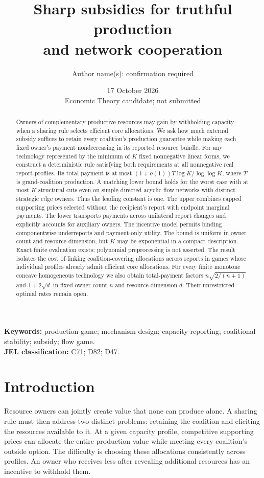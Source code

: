 \documentclass[11pt]{article}
\title{Sharp subsidies for truthful production\\and network cooperation}
\author{Author name(s): confirmation required}
\date{17 October 2026\\[2pt]\small Economic Theory candidate; not submitted}
\theoremstyle{definition}\newtheorem{definition}[theorem]{Definition}
\theoremstyle{remark}\newtheorem{remark}[theorem]{Remark}
\begin{document}
\maketitle
\begin{abstract}
Owners of complementary productive resources may gain by withholding capacity
when a sharing rule selects efficient core allocations. We ask how much
external subsidy suffices to retain every coalition's production guarantee
while making each fixed owner's payment nondecreasing in its reported
resource bundle. For any technology represented by the minimum of $K$ fixed
nonnegative linear forms, we construct a deterministic rule satisfying both
requirements at all nonnegative real report profiles. Its total payment is
at most $(1+o(1))T\log K/\log\log K$, where $T$ is grand-coalition production.
A matching lower bound holds for the worst case with at most $K$ structural
cuts even on simple directed acyclic flow networks with distinct strategic
edge owners. Thus the leading constant is one. The upper combines capped
supporting prices selected without the recipient's report with endpoint
marginal payments. The lower transports payments across unilateral report
changes and explicitly accounts for auxiliary owners. The incentive model
permits binding componentwise underreports and payment-only utility.
The bound is uniform in owner count and resource dimension, but $K$ may be
exponential in a compact description. Exact finite evaluation exists;
polynomial preprocessing is not asserted. The result isolates the cost of
linking coalition-covering allocations across reports in games whose
individual profiles already admit efficient core allocations. For every finite
monotone concave homogeneous technology we also obtain total-payment factors
$n\sqrt{2/(n+1)}$ and $1+2\sqrt d$ in fixed owner count $n$ and resource
dimension $d$. Their unrestricted optimal rates remain open.
\end{abstract}
\noindent\textbf{Keywords:} production game; mechanism design; capacity reporting;
coalitional stability; subsidy; flow game.\\
\textbf{JEL classification:} C71; D82; D47.

\section{Introduction}
Resource owners can jointly create value that none can produce alone. A
sharing rule must then address two distinct problems: retaining the coalition
and eliciting the resources available to it. At a given capacity profile,
competitive supporting prices can allocate the entire production value while
meeting every coalition's outside option. The difficulty is choosing these
allocations consistently across profiles. An owner who receives less after
revealing additional resources has an incentive to withhold them.
\end{document}
